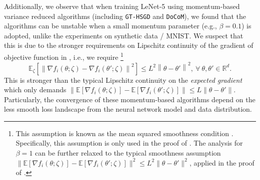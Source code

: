 \documentclass[10pt]{article} %
\newcommand{\revision}{}
\theoremstyle{plain}
\theoremstyle{definition}
\theoremstyle{remark}
\newcommand{\aname}{{\tt DoCoM}}
\newcommand{\norm}[1]{\left\| #1 \right\|}
\begin{document}
Additionally, we observe that when training LeNet-5 using momentum-based variance reduced algorithms (including {\tt GT-HSGD} and \aname), we found that the algorithms can be unstable when a small momentum parameter (e.g., $\beta = 0.1$) is adopted, unlike the experiments on synthetic data / MNIST. We suspect that this is due to the stronger requirements on Lipschitz continuity of the gradient of objective function in , i.e., we require\vspace{-.2cm}
\footnote{This assumption is known as the mean squared smoothness condition \citep{arjevani2019lower}. Specifically, this assumption is only used in the proof of .
The analysis for $\beta=1$ can be further relaxed to the typical smoothness assumption $\| \mathbb{E}[ \nabla f_i( \theta; \zeta )] - \mathbb{E}[ \nabla f_i( \theta'; \zeta )] \|^2 \leq L^2 \| \theta - \theta' \|^2$, applied in the proof of .}
{\revision
\begin{equation*}
    \mathbb{E}_{\zeta} \left[ \norm{ \nabla f_i( \theta; \zeta ) - \nabla f_i( \theta'; \zeta ) }^2 \right] \leq L^2 \norm{ \theta - \theta' }^2,~\forall~ \theta, \theta' \in \mathbb{R}^d. 
\end{equation*}
}
This is stronger than the typical Lipschitz continuity on the \emph{expected gradient} which only demands $\| \mathbb{E}[ \nabla f_i( \theta; \zeta )] - \mathbb{E}[ \nabla f_i( \theta'; \zeta )] \| \leq L \| \theta - \theta' \|$. 
Particularly, the convergence of these momentum-based algorithms depend on the less smooth loss landscape from the neural network model and data distribution.
\end{document}
